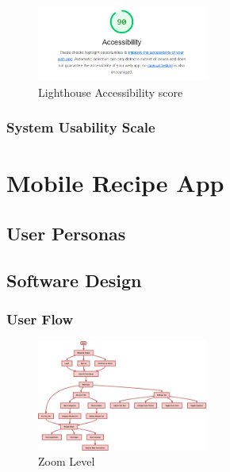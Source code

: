 \documentclass[]{project_final}
\begin{document}
\begin{figure}[ht!]
    \centering
    \includegraphics[width=0.5\textwidth]{lighthouse.png}
    \vspace*{0.0cm}
    \caption{Lighthouse Accessibility score}
    \label{fig:1}
\end{figure}

\subsubsection{System Usability Scale}


\section{Mobile Recipe App}
\subsection{User Personas}
\subsection{Software Design}
\subsubsection{User Flow}

\begin{figure}[ht!]
    \centering
    \includegraphics[width=0.5\textwidth]{MRAuserflow.png}
    \vspace*{0.0cm}
    \caption{Zoom Level}
    \label{fig:1}
\end{figure}
\newpage
\end{document}
